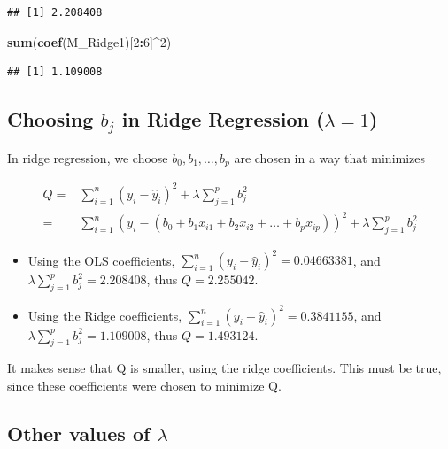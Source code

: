 \documentclass[]{book}
\newenvironment{Shaded}{\begin{snugshade}}{\end{snugshade}}
\newcommand{\KeywordTok}[1]{\textcolor[rgb]{0.13,0.29,0.53}{\textbf{#1}}}
\newcommand{\DecValTok}[1]{\textcolor[rgb]{0.00,0.00,0.81}{#1}}
\newcommand{\OperatorTok}[1]{\textcolor[rgb]{0.81,0.36,0.00}{\textbf{#1}}}
\newcommand{\NormalTok}[1]{#1}
\begin{document}
\begin{verbatim}
## [1] 2.208408
\end{verbatim}

\begin{Shaded}
\begin{Highlighting}[]
\KeywordTok{sum}\NormalTok{(}\KeywordTok{coef}\NormalTok{(M_Ridge1)[}\DecValTok{2}\OperatorTok{:}\DecValTok{6}\NormalTok{]}\OperatorTok{^}\DecValTok{2}\NormalTok{)}
\end{Highlighting}
\end{Shaded}

\begin{verbatim}
## [1] 1.109008
\end{verbatim}

\subsection{\texorpdfstring{Choosing \(b_j\) in Ridge Regression
(\(\lambda=1\))}{Choosing b\_j in Ridge Regression (\textbackslash{}lambda=1)}}\label{choosing-b_j-in-ridge-regression-lambda1}

In ridge regression, we choose \(b_0, b_1, \ldots, b_p\) are chosen in a
way that minimizes

\[
\begin{aligned}
Q=& \displaystyle\sum_{i=1}^n (y_i -\hat{y}_i)^2  + \lambda\displaystyle\sum_{j=1}^pb_j^2\\ =  & \displaystyle\sum_{i=1}^n (y_i -(b_0 + b_1x_{i1} + b_2x_{i2} + \ldots + b_px_{ip}))^2 + \lambda\displaystyle\sum_{j=1}^pb_j^2
\end{aligned}
\]

\begin{itemize}
\item
  Using the OLS coefficients,
  \(\displaystyle\sum_{i=1}^n (y_i -\hat{y}_i)^2 = 0.04663381\), and
  \(\lambda\displaystyle\sum_{j=1}^pb_j^2=2.208408\), thus
  \(Q=2.255042\).
\item
  Using the Ridge coefficients,
  \(\displaystyle\sum_{i=1}^n (y_i -\hat{y}_i)^2 = 0.3841155\), and
  \(\lambda\displaystyle\sum_{j=1}^pb_j^2=1.109008\), thus
  \(Q=1.493124\).
\end{itemize}

It makes sense that Q is smaller, using the ridge coefficients. This
must be true, since these coefficients were chosen to minimize Q.

\subsection{\texorpdfstring{Other values of
\(\lambda\)}{Other values of \textbackslash{}lambda}}\label{other-values-of-lambda}
\end{document}
